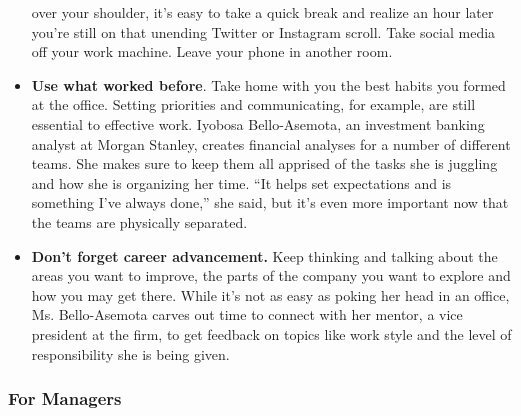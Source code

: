 \begin{itemize}
  over your shoulder, it's easy to take a quick break and realize an
  hour later you're still on that unending Twitter or Instagram scroll.
  Take social media off your work machine. Leave your phone in another
  room.
\item
  \textbf{Use what worked before}. Take home with you the best habits
  you formed at the office. Setting priorities and communicating, for
  example, are still essential to effective work. Iyobosa Bello-Asemota,
  an investment banking analyst at Morgan Stanley, creates financial
  analyses for a number of different teams. She makes sure to keep them
  all apprised of the tasks she is juggling and how she is organizing
  her time. ``It helps set expectations and is something I've always
  done,'' she said, but it's even more important now that the teams are
  physically separated.
\item
  \textbf{Don't forget career advancement.} Keep thinking and talking
  about the areas you want to improve, the parts of the company you want
  to explore and how you may get there. While it's not as easy as poking
  her head in an office, Ms. Bello-Asemota carves out time to connect
  with her mentor, a vice president at the firm, to get feedback on
  topics like work style and the level of responsibility she is being
  given.
\end{itemize}

\hypertarget{for-managers}{%
\subsubsection{\texorpdfstring{\textbf{For
Managers}}{For Managers}}\label{for-managers}}

